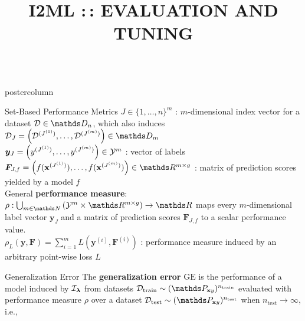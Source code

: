 \documentclass{beamer}
\title{I2ML :\,: EVALUATION AND TUNING} %
\newlength{\columnheight} %
\begin{document}
\begin{frame}[fragile]{}
\vspace{-8ex}
\begin{columns}
	\begin{column}{.31\textwidth}
		\begin{beamercolorbox}[center]{postercolumn}
			\begin{minipage}{.98\textwidth}
				\parbox[t][\columnheight]{\textwidth}{
\begin{myblock}{Set-Based Performance Metrics}
$J \in \{1,\dots,n\}^m$ : $m$-dimensional index vector for a dataset $\D \in 
\allDatasetsn$, which also induces 
$\D_J = \left(\D^{(J^{(1)})},\dots,\D^{(J^{(m)})}\right) \in \allDatasets_m$\\


$\boldsymbol{y}_J = \left(y^{(J^{(1)})},\dots,y^{(J^{(m)})}\right) \in \mathcal{Y}^m$ :
vector of labels\\

$\boldsymbol{F}_{J,f} = \left(f(\xv^{(J^{(1)})}),\dots, f(\xv^{(J^{(m)})})\right) 
\in \R^{m\times g}$ : matrix of prediction scores yielded by a model $f$\\

General \textbf{performance measure}: $\rho: \bigcup_{m\in\N}\left(\Yspace^m\times\R^{m\times g}\right)  \rightarrow \R$ maps every $m$-dimensional label vector $\boldsymbol{y}_J$ and a matrix of prediction scores $\boldsymbol{F}_{J,f}$ to a scalar performance value.\\

$\rho_L (\boldsymbol{y}, \boldsymbol{F}) = \sum_{i=1}^m L(\boldsymbol{y}^{(i)}, \boldsymbol{F}^{(i)})$ : performance measure induced by an arbitrary point-wise loss $L$

\end{myblock}
\begin{myblock}{Generalization Error}
The \textbf{generalization error} $\mathrm{GE}$ is the performance of a model induced by $\mathcal{I}_{\boldsymbol{\lambda}}$ from datasets $\Dtrain \sim (\P_{\xv y})^{n_{\mathrm{train}}}$ evaluated with performance measure $\rho$ over a dataset $\Dtest \sim (\P_{\xv y})^{n_{\mathrm{test}}}$ when $n_{\mathrm{test}}\rightarrow\infty$, i.e.,\\


\end{myblock}}
\end{minipage}
\end{beamercolorbox}
\end{column}
\end{columns}
\end{frame}
\end{document}
